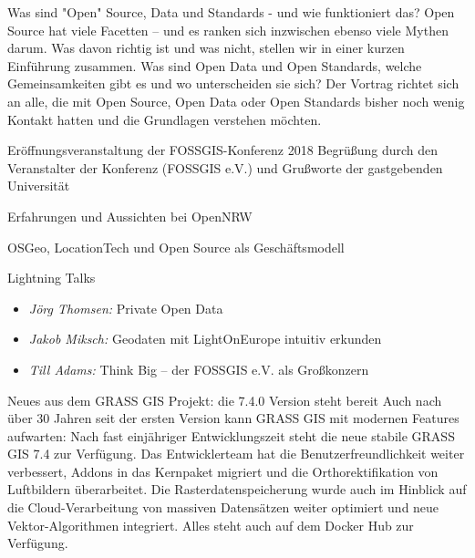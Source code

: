 \newpage



\renewcommand{\conferenceDay}{\mittwoch}
%
{Was sind "Open" Source, Data und Standards - und wie funktioniert das?}%
{}%
{Open Source hat viele Facetten -- und es ranken sich inzwischen ebenso viele Mythen darum. Was
davon richtig ist und was nicht, stellen wir in einer kurzen Einführung zusammen. Was sind Open Data
und Open Standards, welche Gemeinsamkeiten gibt es und wo unterscheiden sie sich? Der Vortrag
richtet sich an alle, die mit Open Source, Open Data oder Open Standards bisher noch wenig Kontakt
hatten und die Grundlagen verstehen möchten.}

%
%
{Eröffnungsveranstaltung der FOSSGIS-Konferenz 2018}%
{}%
{Begrüßung durch den Veranstalter der Konferenz (FOSSGIS e.V.) und Grußworte der gastgebenden Universität}
\enlargethispage{1\baselineskip}

%
%
{Erfahrungen und Aussichten bei OpenNRW}%
{}%
{}

%
{OSGeo, LocationTech und Open Source als Geschäftsmodell}%
{}{}

%
\abstractWPH{}%
{Lightning Talks}%
{}%
{%
  \vspace{-2em}
  \begin{itemize}
    \RaggedRight
    \setlength{\itemsep}{-2pt} %
    \item \emph{Jörg Thomsen:} Private Open Data
    \item \emph{Jakob Miksch:} Geodaten mit LightOnEurope intuitiv erkunden
    \item \emph{Till Adams:} Think Big -- der FOSSGIS e.V. als Großkonzern
  \end{itemize}
  \justifying
}

%
{Neues aus dem GRASS GIS Projekt: die 7.4.0 Version steht bereit}%
{}%
{
  Auch nach über 30 Jahren seit der ersten Version kann GRASS GIS mit modernen Features aufwarten: Nach fast einjähriger Entwicklungszeit steht die neue stabile GRASS GIS 7.4 zur Verfügung. Das  Entwicklerteam hat die Benutzerfreundlichkeit weiter verbessert, Addons in das Kernpaket migriert und die Orthorektifikation von Luftbildern überarbeitet. Die Rasterdatenspeicherung wurde auch im Hinblick auf die Cloud-Verarbeitung von massiven Datensätzen weiter optimiert und neue Vektor-Algorithmen integriert. Alles steht auch auf dem Docker Hub zur Verfügung.%
}


